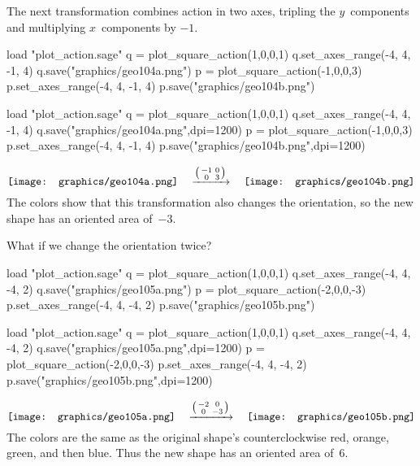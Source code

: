 The next transformation combines action in two axes, 
tripling the $y$~components and multiplying 
$x$~components by $-1$. 
\begin{sageoutput}[d,0,4;d,5,7]
load "plot_action.sage"
q = plot_square_action(1,0,0,1) 
q.set_axes_range(-4, 4, -1, 4) 
q.save("graphics/geo104a.png")
p = plot_square_action(-1,0,0,3) 
p.set_axes_range(-4, 4, -1, 4) 
p.save("graphics/geo104b.png")
\end{sageoutput}
\begin{sagesilent}
load "plot_action.sage"
q = plot_square_action(1,0,0,1) 
q.set_axes_range(-4, 4, -1, 4) 
q.save("graphics/geo104a.png",dpi=1200)
p = plot_square_action(-1,0,0,3) 
p.set_axes_range(-4, 4, -1, 4) 
p.save("graphics/geo104b.png",dpi=1200)
\end{sagesilent}
\begin{equation*}
  \vcenteredhbox{\texttt{[image: graphics/geo104a.png]}}
  \quad\mapsvia{\big (\begin{smallmatrix} -1 &0 \\ 0 &3 \end{smallmatrix}\big )}\quad
  \vcenteredhbox{\texttt{[image: graphics/geo104b.png]}}
\end{equation*}
The colors show that this transformation also changes
the orientation, so the new shape has an oriented area of~$-3$.

What if we change the orientation twice?
\begin{sageoutput}[d,0,4;d,5,7]
load "plot_action.sage"
q = plot_square_action(1,0,0,1) 
q.set_axes_range(-4, 4, -4, 2) 
q.save("graphics/geo105a.png")
p = plot_square_action(-2,0,0,-3) 
p.set_axes_range(-4, 4, -4, 2) 
p.save("graphics/geo105b.png")
\end{sageoutput}
\begin{sagesilent}
load "plot_action.sage"
q = plot_square_action(1,0,0,1) 
q.set_axes_range(-4, 4, -4, 2) 
q.save("graphics/geo105a.png",dpi=1200)
p = plot_square_action(-2,0,0,-3) 
p.set_axes_range(-4, 4, -4, 2) 
p.save("graphics/geo105b.png",dpi=1200)
\end{sagesilent}
\begin{equation*}
  \vcenteredhbox{\texttt{[image: graphics/geo105a.png]}}
  \quad\mapsvia{\big (\begin{smallmatrix} -2 &0 \\ 0 &-3 \end{smallmatrix}\big )}\quad
  \vcenteredhbox{\texttt{[image: graphics/geo105b.png]}}
\end{equation*}
The colors are the same as the original shape's counterclockwise
red, orange, green, and then blue.
Thus the new shape has an oriented area of~$6$.

